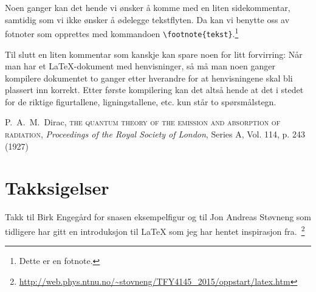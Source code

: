 \documentclass[a4paper,11pt]{article}
\begin{document}
Noen ganger kan det hende vi ønsker å komme med en liten sidekommentar, samtidig som vi ikke ønsker å ødelegge tekstflyten. Da kan vi benytte oss av fotnoter som opprettes med kommandoen \texttt{\textbackslash footnote\{tekst\}}.\footnote{Dette er en fotnote.}

Til slutt en liten kommentar som kanskje kan spare noen for litt forvirring:
Når man har et \LaTeX{}-dokument med henvisninger, så må man noen ganger kompilere dokumentet to ganger etter hverandre for at henvisningene skal bli plassert inn korrekt. Etter første kompilering kan det altså hende at det i stedet for de riktige figurtallene, ligningstallene, etc. kun står to spørsmålstegn.

\begin{thebibliography}{10}
 P.~A.~M.~Dirac, \textsc{the quantum theory of the emission and absorption of radiation}, \textit{Proceedings of the Royal Society of London}, Series A, Vol. 114, p. 243 (1927)
\end{thebibliography}

\newpage
\section*{Takksigelser}
Takk til Birk Engegård for snasen eksempelfigur og til Jon Andreas Støvneng som tidligere har gitt en introduksjon til \LaTeX{} som jeg har hentet inspirasjon fra.~\footnote{\url{http://web.phys.ntnu.no/~stovneng/TFY4145_2015/oppstart/latex.htm}}
\end{document}

